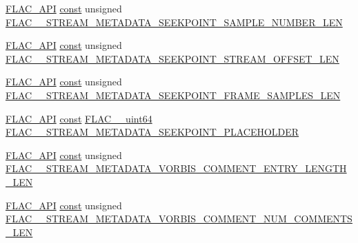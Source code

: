 \begin{DoxyCompactItemize}
\item 
\hyperlink{group__flac__export_ga56ca07df8a23310707732b1c0007d6f5}{F\+L\+A\+C\+\_\+\+A\+PI} \hyperlink{zconf_8h_a2c212835823e3c54a8ab6d95c652660e}{const} unsigned \hyperlink{group__flac__format_ga8fe65704a9be1ad13a1654e78ab80c32}{F\+L\+A\+C\+\_\+\+\_\+\+S\+T\+R\+E\+A\+M\+\_\+\+M\+E\+T\+A\+D\+A\+T\+A\+\_\+\+S\+E\+E\+K\+P\+O\+I\+N\+T\+\_\+\+S\+A\+M\+P\+L\+E\+\_\+\+N\+U\+M\+B\+E\+R\+\_\+\+L\+EN}
\item 
\hyperlink{group__flac__export_ga56ca07df8a23310707732b1c0007d6f5}{F\+L\+A\+C\+\_\+\+A\+PI} \hyperlink{zconf_8h_a2c212835823e3c54a8ab6d95c652660e}{const} unsigned \hyperlink{group__flac__format_gac351fcf185d0a36ddf6f0d358258ed5c}{F\+L\+A\+C\+\_\+\+\_\+\+S\+T\+R\+E\+A\+M\+\_\+\+M\+E\+T\+A\+D\+A\+T\+A\+\_\+\+S\+E\+E\+K\+P\+O\+I\+N\+T\+\_\+\+S\+T\+R\+E\+A\+M\+\_\+\+O\+F\+F\+S\+E\+T\+\_\+\+L\+EN}
\item 
\hyperlink{group__flac__export_ga56ca07df8a23310707732b1c0007d6f5}{F\+L\+A\+C\+\_\+\+A\+PI} \hyperlink{zconf_8h_a2c212835823e3c54a8ab6d95c652660e}{const} unsigned \hyperlink{group__flac__format_gadf07cc8895679fc151c2cc4609d8c394}{F\+L\+A\+C\+\_\+\+\_\+\+S\+T\+R\+E\+A\+M\+\_\+\+M\+E\+T\+A\+D\+A\+T\+A\+\_\+\+S\+E\+E\+K\+P\+O\+I\+N\+T\+\_\+\+F\+R\+A\+M\+E\+\_\+\+S\+A\+M\+P\+L\+E\+S\+\_\+\+L\+EN}
\item 
\hyperlink{group__flac__export_ga56ca07df8a23310707732b1c0007d6f5}{F\+L\+A\+C\+\_\+\+A\+PI} \hyperlink{zconf_8h_a2c212835823e3c54a8ab6d95c652660e}{const} \hyperlink{ordinals_8h_aa78c8c70a3eb8a58af7436f278acde8e}{F\+L\+A\+C\+\_\+\+\_\+uint64} \hyperlink{group__flac__format_ga39373aa806e3132146c1f29f35a23877}{F\+L\+A\+C\+\_\+\+\_\+\+S\+T\+R\+E\+A\+M\+\_\+\+M\+E\+T\+A\+D\+A\+T\+A\+\_\+\+S\+E\+E\+K\+P\+O\+I\+N\+T\+\_\+\+P\+L\+A\+C\+E\+H\+O\+L\+D\+ER}
\item 
\hyperlink{group__flac__export_ga56ca07df8a23310707732b1c0007d6f5}{F\+L\+A\+C\+\_\+\+A\+PI} \hyperlink{zconf_8h_a2c212835823e3c54a8ab6d95c652660e}{const} unsigned \hyperlink{group__flac__format_ga0153a5ed9577e276250dc8414e236172}{F\+L\+A\+C\+\_\+\+\_\+\+S\+T\+R\+E\+A\+M\+\_\+\+M\+E\+T\+A\+D\+A\+T\+A\+\_\+\+V\+O\+R\+B\+I\+S\+\_\+\+C\+O\+M\+M\+E\+N\+T\+\_\+\+E\+N\+T\+R\+Y\+\_\+\+L\+E\+N\+G\+T\+H\+\_\+\+L\+EN}
\item 
\hyperlink{group__flac__export_ga56ca07df8a23310707732b1c0007d6f5}{F\+L\+A\+C\+\_\+\+A\+PI} \hyperlink{zconf_8h_a2c212835823e3c54a8ab6d95c652660e}{const} unsigned \hyperlink{group__flac__format_gaa45c45967901bd6002d2a0ccbb208e02}{F\+L\+A\+C\+\_\+\+\_\+\+S\+T\+R\+E\+A\+M\+\_\+\+M\+E\+T\+A\+D\+A\+T\+A\+\_\+\+V\+O\+R\+B\+I\+S\+\_\+\+C\+O\+M\+M\+E\+N\+T\+\_\+\+N\+U\+M\+\_\+\+C\+O\+M\+M\+E\+N\+T\+S\+\_\+\+L\+EN}

\end{DoxyCompactItemize}
